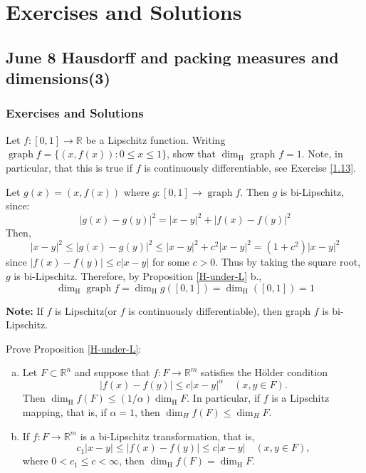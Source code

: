 \section{Exercises and Solutions}
\subsection{June 8 Hausdorff and packing measures and dimensions(3)}
\subsubsection{Exercises and Solutions}
\begin{customexercise}{3.7}
    Let $f:[0,1] \rightarrow \mathbb{R}$ be a Lipschitz function. Writing $\operatorname{graph} f=\{(x, f(x)): 0 \leq x \leq 1\}$, show that $\operatorname{dim}_{\mathrm{H}}$ graph $f=1 .$ Note, in
particular, that this is true if $f$ is continuously differentiable, see Exercise \ref{1.13}.
\end{customexercise}
\begin{customsol}{3.7}
   Let $g(x)=(x, f(x))$ where $g:[0,1] \rightarrow \operatorname{graph} f$. Then $g$ is bi-Lipschitz, since:
$$
|g(x)-g(y)|^{2}=|x-y|^{2}+|f(x)-f(y)|^{2}
$$
Then,
$$
|x-y|^{2} \leq|g(x)-g(y)|^{2} \leq|x-y|^{2}+c^{2}|x-y|^{2}=\left(1+c^{2}\right)|x-y|^{2}
$$
since $|f(x)-f(y)| \leq c|x-y|$ for some $c>0$. Thus by taking the square root, $g$ is bi-Lipschitz. Therefore, by Proposition \ref{H-under-L} b., 
$$\operatorname{dim}_{\mathrm{H}} \operatorname{graph} f = \operatorname{dim}_{\mathrm{H}} g([0,1]) = \operatorname{dim}_{\mathrm{H}}([0,1]) = 1$$
\end{customsol}

\textbf{Note: }If $f$ is Lipschitz(or $f$ is continuously differentiable), then graph $f$ is bi-Lipschitz. 


\begin{customexercise}{}
    Prove Proposition \ref{H-under-L}:
    \begin{enumerate}[(a)]
        \item Let $F \subset \mathbb{R}^{n}$ and suppose that $f: F \rightarrow \mathbb{R}^{m}$ satisfies the Hölder condition
$$
|f(x)-f(y)| \leq c|x-y|^{\alpha} \quad(x, y \in F) .
$$
Then $\operatorname{dim}_{\mathrm{H}} f(F) \leq(1 / \alpha) \operatorname{dim}_{\mathrm{H}} F .$ In particular, if $f$ is a Lipschitz
mapping, that is, if $\alpha=1$, then $\operatorname{dim}_{H} f(F) \leq \operatorname{dim}_{H} F$.
\item If $f: F \rightarrow \mathbb{R}^{m}$ is a bi-Lipschitz transformation, that is,
$$
c_{1}|x-y| \leq|f(x)-f(y)| \leq c|x-y| \quad(x, y \in F),
$$
where $0<c_{1} \leq c<\infty$, then $\operatorname{dim}_{\mathrm{H}} f(F)=\operatorname{dim}_{\mathrm{H}} F$.
    \end{enumerate}
\end{customexercise}

